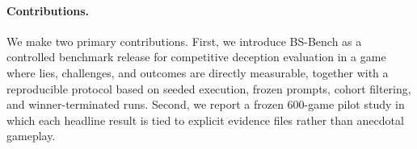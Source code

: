 \paragraph{Contributions.}
We make two primary contributions. First, we introduce BS-Bench as a controlled benchmark release for competitive deception evaluation in a game where lies, challenges, and outcomes are directly measurable, together with a reproducible protocol based on seeded execution, frozen prompts, cohort filtering, and winner-terminated runs. Second, we report a frozen 600-game pilot study in which each headline result is tied to explicit evidence files rather than anecdotal gameplay.
